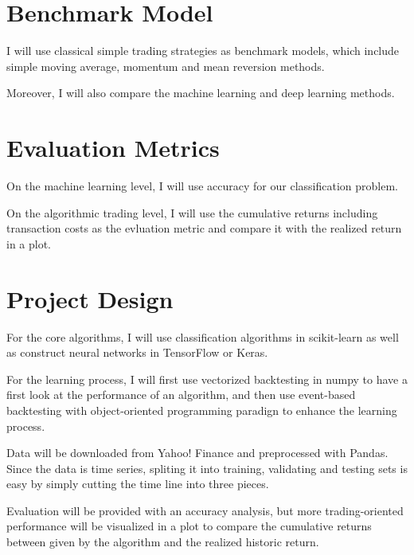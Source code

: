 \documentclass[11pt]{article} %
\begin{document}
\section{Benchmark Model}

I will use classical simple trading strategies as benchmark models, which include simple moving average, momentum and mean reversion methods. 

Moreover, I will also compare the machine learning and deep learning methods. 


\section{Evaluation Metrics}

On the machine learning level, I will use accuracy for our classification problem.

On the algorithmic trading level, I will use the cumulative returns including transaction costs as the evluation metric and compare it with the realized return in a plot.


\section{Project Design}

For the core algorithms, I will use classification algorithms in scikit-learn as well as construct neural networks in TensorFlow or Keras.

For the learning process, I will first use vectorized backtesting in numpy to have a first look at the performance of an algorithm, and then use event-based backtesting with object-oriented programming paradign to enhance the learning process.

Data will be downloaded from Yahoo! Finance and preprocessed with Pandas. Since the data is time series, spliting it into training, validating and testing sets is easy by simply cutting the time line into three pieces.

Evaluation will be provided with an accuracy analysis, but more trading-oriented performance will be visualized in a plot to compare the cumulative returns between given by the algorithm and the realized historic return.
\end{document}
